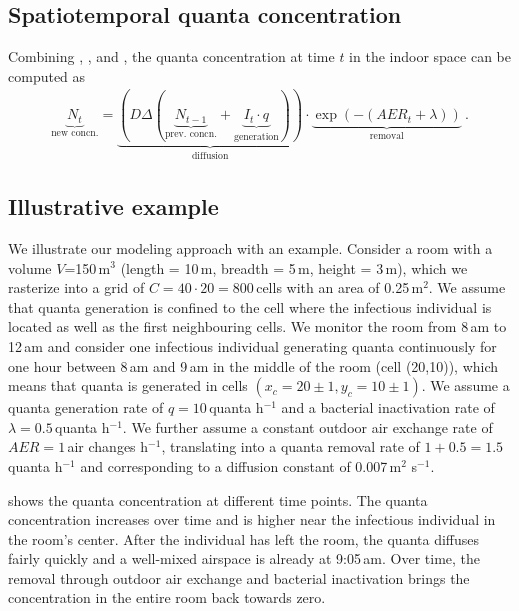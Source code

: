 \documentclass[fleqn,11pt]{wlscirep_supp}
\begin{document}
\subsection{Spatiotemporal quanta concentration}

Combining , , and , the quanta concentration at time $t$ in the indoor space can be computed as
\begin{align}\label{eq:spattemp-N}
    \underbrace{N_{t}}_{\text{new concn.}} = \underbrace{\left(D \Delta (\underbrace{N_{t-1}}_{\text{prev. concn.}} + \underbrace{I_t \cdot q}_{\text{generation}})\right)}_{\text{diffusion}} \cdot \underbrace{\exp\left(-(AER_t + \lambda)\right)}_{\text{removal}} ~.
\end{align}

\subsection{Illustrative example}\label{sec:example}

We illustrate our modeling approach with an example. Consider a room with a volume $V$=150\,m$^3$ (length = 10\,m, breadth = 5\,m, height = 3\,m), which we rasterize into a grid of $C = 40 \cdot 20 = 800$\,cells with an area of 0.25\,m$^2$. We assume that quanta generation is confined to the cell where the infectious individual is located as well as the first neighbouring cells. We monitor the room from 8\,am to 12\,am and consider one infectious individual generating quanta continuously for one hour between 8\,am and 9\,am in the middle of the room (cell (20,10)), which means that quanta is generated in cells $(x_c = 20\pm1, y_c = 10\pm1)$. We assume a quanta generation rate of $q = 10$\,quanta h$^{-1}$ and a bacterial inactivation rate of $\lambda = 0.5$\,quanta h$^{-1}$. We further assume a constant outdoor air exchange rate of $AER = 1$\,air changes h$^{-1}$, translating into a quanta removal rate of $1 + 0.5 = 1.5$\,quanta h$^{-1}$ and corresponding to a diffusion constant of 0.007\,m$^2$ s$^{-1}$. 

 shows the quanta concentration at different time points. The quanta concentration increases over time and is higher near the infectious individual in the room's center. After the individual has left the room, the quanta diffuses fairly quickly and a well-mixed airspace is already at 9:05\,am. Over time, the removal through outdoor air exchange and bacterial inactivation brings the concentration in the entire room back towards zero. 
\end{document}
